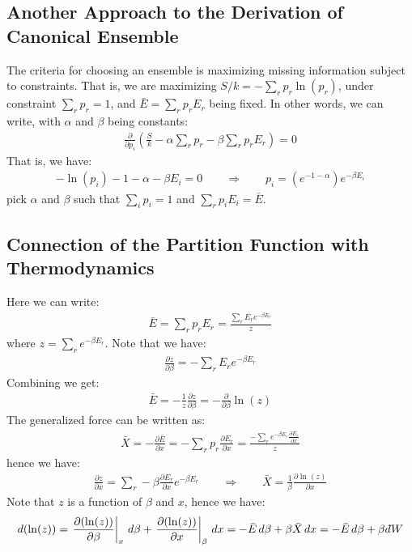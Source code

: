 \documentclass[11pt,oneside]{book}
\theoremstyle{break}
\theoremstyle{break}
\newcommand{\dbar}{d\hspace*{-0.08em}\bar{}\hspace*{0.1em}}
\begin{document}
\subsection*{Another Approach to the Derivation of Canonical Ensemble}
The criteria for choosing an ensemble is maximizing missing information subject to constraints. That is, we are maximizing $S/k = -\sum_r p_r \ln(p_r)$, under constraint $\sum_r p_r = 1$, and $\bar{E} = \sum_r p_r E_r$ being fixed. In other words, we can write, with $\alpha$ and $\beta$ being constants:
\begin{align*}
\frac{\partial}{\partial p_i}\left(\frac{S}{k} - \alpha\sum_r p_r - \beta \sum_r  p_r E_r \right) = 0
\end{align*}
That is, we have:
\begin{align*}
-\ln(p_i) - 1 - \alpha - \beta E_i = 0 \qquad \Rightarrow \qquad p_i = (e^{-1 - \alpha})e^{-\beta E_i}
\end{align*}
pick $\alpha$ and $\beta$ such that $\sum_i p_i = 1$ and $\sum_r p_i E_i = \bar{ E}$. \\

\newpage
\subsection{Connection of the Partition Function with Thermodynamics}
Here we can write:
\begin{align*}
\bar{E} = \sum_r p_r E_r = \frac{\sum_r E_r e^{-\beta E_r}}{z}
\end{align*}
where $z = \sum_r e^{-\beta E_r}$. Note that we have:
\begin{align*}
\frac{\partial z}{\partial \beta} = -\sum_r E_r e^{-\beta E_r}
\end{align*}
Combining we get:
\begin{align*}
\bar{E} = -\frac{1}{z}\frac{\partial z}{\partial  \beta} = -\frac{\partial }{\partial \beta}\ln(z)
\end{align*}
The generalized force can be written as:
\begin{align*}
\bar{X} = -\frac{\partial \bar{E}}{\partial x} = -\sum_r p_r \frac{\partial E_r}{\partial x} = \frac{-\sum_r e^{-\beta E_r} \frac{\partial E_r}{\partial x}}{z}
\end{align*}
hence we have:
\begin{align*}
\frac{\partial z}{\partial x} = \sum_r -\beta \frac{\partial E_r}{\partial x}e^{-\beta E_r} \qquad \Rightarrow \qquad \bar{X} = \frac{1}{\beta}\frac{\partial \ln(z)}{\partial x}
\end{align*}
Note that $z$ is a function of $\beta$ and $x$, hence we have:
\begin{align*}
d(\ln(z)) = \left.\frac{\partial (\ln(z))}{\partial \beta}\right|_{x}\, d\beta + \left.\frac{\partial (\ln(z))}{\partial x}\right|_{\beta}\, dx = -\bar{E}\, d\beta + \beta \bar{X}\, dx = -\bar{E}\, d\beta + \beta \dbar W 
\end{align*}
\end{document}
